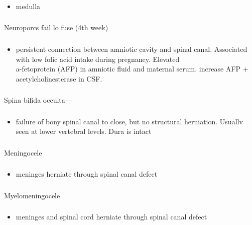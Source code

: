 \documentclass[11pt]{beamer}
\begin{document}
\begin{frame}
 \frametitle{}
\begin{itemize}
\item{medulla }
\end{itemize}
\end{frame}

\begin{frame}
 \frametitle{}
Neuroporcs fail lo fuse (4th week)
\end{frame}

\begin{frame}
 \frametitle{}
\begin{itemize}
\item{persistent connection between amniotic cavity and spinal canal. Associated with low folic acid intake during pregnancy. Elevated \\ a-fetoprotein (AFP) in amniotic fluid and maternal serum. increase AFP + acetylcholinesterase in CSF. }
\end{itemize}
\end{frame}

\begin{frame}
 \frametitle{}
Spina bifida occulta—
\end{frame}

\begin{frame}
 \frametitle{}
\begin{itemize}
\item{failure of bony spinal canal to close, but no structural herniation. Usuallv seen at lower vertebral levels. Dura is intact}
\end{itemize}
\end{frame}

\begin{frame}
 \frametitle{}
Meningocele 
\end{frame}

\begin{frame}
 \frametitle{}
\begin{itemize}
\item{meninges herniate through spinal canal defect }
\end{itemize}
\end{frame}

\begin{frame}
 \frametitle{}
Myelomeningocele 
\end{frame}

\begin{frame}
 \frametitle{}
\begin{itemize}
\item{meninges and spinal cord herniate through spinal canal defect }
\end{itemize}
\end{frame}
\end{document}
